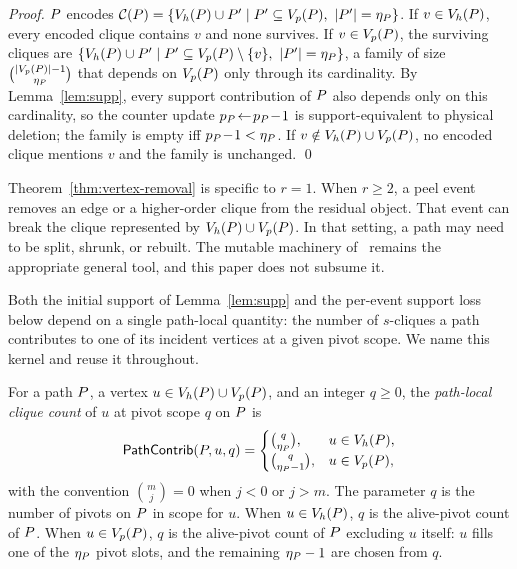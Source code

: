 \begin{proof}
$\TPath$ encodes $\mathcal{C}(\TPath)=\{\Vh(\TPath)\cup P'\mid P'\subseteq\Vp(\TPath),\ |P'|=\eta_{\TPath}\}$.
%
If $v\in\Vh(\TPath)$, every encoded clique contains $v$ and none survives.
%
If $v\in\Vp(\TPath)$, the surviving cliques are $\{\Vh(\TPath)\cup P'\mid P'\subseteq\Vp(\TPath)\setminus\{v\},\ |P'|=\eta_{\TPath}\}$, a family of size $\binom{|\Vp(\TPath)|-1}{\eta_{\TPath}}$ that depends on $\Vp(\TPath)$ only through its cardinality.
%
By Lemma~\ref{lem:supp}, every support contribution of $\TPath$ also depends only on this cardinality, so the counter update $p_{\TPath}\!\leftarrow\!p_{\TPath}\!-\!1$ is support-equivalent to physical deletion; the family is empty iff $p_{\TPath}\!-\!1<\eta_{\TPath}$.
%
If $v\notin\Vh(\TPath)\cup\Vp(\TPath)$, no encoded clique mentions $v$ and the family is unchanged.
%
\qed
\end{proof}

Theorem~\ref{thm:vertex-removal} is specific to $r=1$.
%
When $r\ge2$, a peel event removes an edge or a higher-order clique from the residual object.
%
That event can break the clique represented by $\Vh(\TPath)\cup\Vp(\TPath)$.
%
In that setting, a path may need to be split, shrunk, or rebuilt.
%
The mutable \cpi{} machinery of~\cite{NuclearCD} remains the appropriate general tool, and this paper does not subsume it.

Both the initial support of Lemma~\ref{lem:supp} and the per-event support loss below depend on a single path-local quantity: the number of $s$-cliques a path contributes to one of its incident vertices at a given pivot scope.
%
We name this kernel and reuse it throughout.

\begin{definition}\label{def:path-contrib}
For a \cpi{} path $\TPath$, a vertex $u\in\Vh(\TPath)\cup\Vp(\TPath)$, and an integer $q\ge0$, the \emph{path-local clique count} of $u$ at pivot scope $q$ on $\TPath$ is
\[
  \pathContrib(\TPath,u,q)=
  \begin{cases}
    \binom{q}{\eta_{\TPath}}, & u\in\Vh(\TPath), \\
    \binom{q}{\eta_{\TPath}-1}, & u\in\Vp(\TPath),
  \end{cases}
\]
with the convention $\binom{m}{j}=0$ when $j<0$ or $j>m$.
%
The parameter $q$ is the number of pivots on $\TPath$ in scope for $u$.
%
When $u\in\Vh(\TPath)$, $q$ is the alive-pivot count of $\TPath$.
%
When $u\in\Vp(\TPath)$, $q$ is the alive-pivot count of $\TPath$ excluding $u$ itself: $u$ fills one of the $\eta_{\TPath}$ pivot slots, and the remaining $\eta_{\TPath}-1$ are chosen from $q$.
\end{definition}

